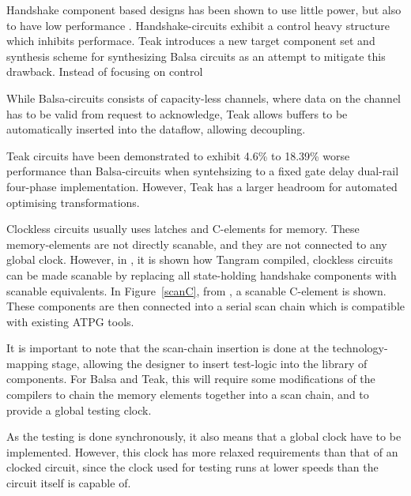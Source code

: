 Handshake component based designs has been shown to use little power,
but also to have low performance \cite{80c51}. Handshake-circuits
exhibit a control heavy structure which inhibits performace. Teak
\cite{teak} introduces a new target component set and synthesis scheme
for synthesizing Balsa circuits as an attempt to mitigate this
drawback. Instead of focusing on control

While Balsa-circuits consists of capacity-less channels, where data on
the channel has to be valid from request to acknowledge, Teak allows
buffers to be automatically inserted into the dataflow, allowing
decoupling. 

Teak circuits have been demonstrated to exhibit 4.6\% to 18.39\% worse
performance than Balsa-circuits when syntehsizing to a fixed gate
delay dual-rail four-phase implementation. However, Teak has a larger
headroom for automated optimising transformations.


Clockless circuits usually uses latches and C-elements for
memory. These memory-elements are not directly scanable, and they are
not connected to any global clock. However, in \cite{fullscan}, it is
shown how Tangram compiled, clockless circuits can be made scanable by
replacing all state-holding handshake components with scanable
equivalents. In Figure~\ref{scanC}, from \cite{fullscan}, a scanable
C-element is shown. These components are then connected into a serial
scan chain which is compatible with existing ATPG tools.

It is important to note that the scan-chain insertion is done at the
technology-mapping stage, allowing the designer to insert test-logic
into the library of components. For Balsa and Teak, this will require
some modifications of the compilers to chain the memory elements
together into a scan chain, and to provide a global testing clock.

As the testing is done synchronously, it also means that a global
clock have to be implemented. However, this clock has more relaxed
requirements than that of an clocked circuit, since the clock used for
testing runs at lower speeds than the circuit itself is capable of.



